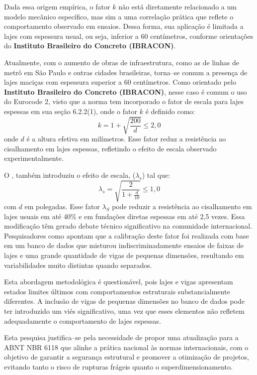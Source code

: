 Dada essa origem empírica, o fator $k$ não está diretamente relacionado a um modelo mecânico específico, mas sim a uma correlação prática que reflete o comportamento observado em ensaios. Dessa forma, sua aplicação é limitada a lajes com espessura usual, ou seja, inferior a 60 centímetros, conforme orientações do \textbf{Instituto Brasileiro do Concreto (IBRACON)}.

Atualmente, com o aumento de obras de infraestrutura, como as de linhas de metrô em São Paulo e outras cidades brasileiras, torna--se comum a presença de lajes maciças com espessura superior a 60 centímetros. Como orientado pelo \textbf{Instituto Brasileiro do Concreto (IBRACON)}, nesse caso é comum o uso do Eurocode 2, visto que a norma tem incorporado o fator de escala para lajes espessas em sua seção 6.2.2(1), onde o fator $k$ é definido como:
\begin{equation}
    k = 1+ \sqrt{\frac{200}{d}} \leq 2,0
\end{equation}
onde $d$ é a altura efetiva em milímetros. Esse fator reduz a resistência ao cisalhamento em lajes espessas, refletindo o efeito de escala observado experimentalmente.

O \textcite{ACI318:2019}, também introduziu o efeito de escala, ($\lambda_s$) tal que:
\begin{equation}
\lambda_s = \sqrt{\frac{2}{1+\frac{d}{10}}}\leq 1,0
\end{equation}
com $d$ em polegadas. Esse fator $\lambda_S$ pode reduzir a resistência ao cisalhamento em lajes usuais em até 40\% e em fundações diretas espessas em até 2,5 vezes. Essa modificação têm gerado debate técnico significativo na comunidade internacional. Pesquisadores como \textcite{Marquesi2021} apontam que a calibração deste fator foi realizada com base em um banco de dados que misturou indiscriminadamente ensaios de faixas de lajes e uma grande quantidade de vigas de pequenas dimensões, resultando em variabilidades muito distintas quando separados.

Esta abordagem metodológica é questionável, pois lajes e vigas apresentam estados limites últimos com comportamentos estruturais substancialmente diferentes. A inclusão de vigas de pequenas dimensões no banco de dados pode ter introduzido um viés significativo, uma vez que esses elementos não refletem adequadamente o comportamento de lajes espessas.

Esta pesquisa justifica--se pela necessidade de propor uma atualização para a ABNT NBR 6118 que alinhe a prática nacional às normas internacionais, com o objetivo de garantir a segurança estrutural e promover a otimização de projetos, evitando tanto o risco de rupturas frágeis quanto o superdimensionamento.

